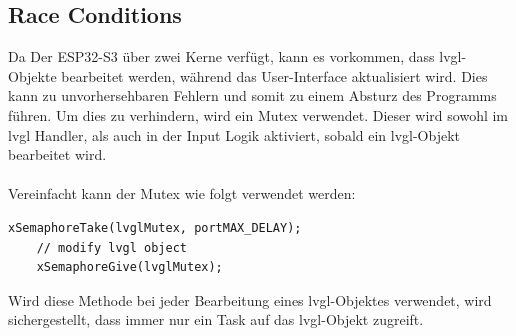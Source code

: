     \subsection{Race Conditions}
    Da Der ESP32-S3 über zwei Kerne verfügt, kann es vorkommen, dass lvgl-Objekte
    bearbeitet werden, während das User-Interface aktualisiert wird. Dies kann
    zu unvorhersehbaren Fehlern und somit zu einem Absturz des Programms führen.
    Um dies zu verhindern, wird ein Mutex verwendet. Dieser wird sowohl
    im lvgl Handler, als auch in der Input Logik aktiviert, sobald ein lvgl-Objekt
    bearbeitet wird.\\~\\
    Vereinfacht kann der Mutex wie folgt verwendet werden:

    \begin{lstlisting}[style=cppCode]
    xSemaphoreTake(lvglMutex, portMAX_DELAY);
    // modify lvgl object
    xSemaphoreGive(lvglMutex);
    \end{lstlisting}

    Wird diese Methode bei jeder Bearbeitung eines lvgl-Objektes verwendet,
    wird sichergestellt, dass immer nur ein Task auf das lvgl-Objekt zugreift.
